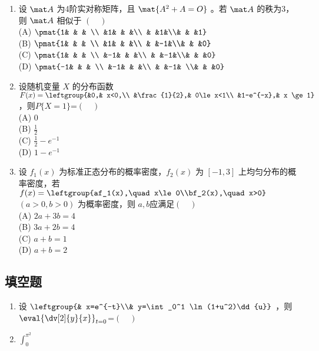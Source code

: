 \begin{enumerate}
\item 设 $\mat A$ 为4阶实对称矩阵，且 $\mat {A^2+A=O}$  。若 $\mat A$ 的秩为3，则 $\mat A$  相似于 $(\quad )$\\
(A) $\pmat{1& & &  \\ &1& & &\\ & &1&\\& & &1}$\\
(B) $\pmat{1& & &  \\ &1& & &\\ & &-1&\\& & &0}$\\
(C) $\pmat{1& & &  \\ &-1& & &\\ & &-1&\\& & &0}$\\
(D) $\pmat{-1& & & \\ &-1& & &\\ & &-1& \\& & &0}$
\item  设随机变量 $X$ 的分布函数 $F(x)=\leftgroup{&0,& x<0,\\ &\frac{1}{2},& 0\le x<1\\ &1-e^{-x},& x \ge 1}$   ，则$P\{X=1\}$=$(\quad )$\\
(A)  $0$\\
(B) $\frac{1}{2}$\\
(C)  $\frac{1}{2}-e^{-1}$\\
(D) $1-e^{-1}$
\item  设 $f_1(x)$ 为标准正态分布的概率密度，$f_2(x)$   为 $[-1,3]$ 上均匀分布的概率密度，若 $f(x)=\leftgroup{af_1(x),\quad x\le0\\bf_2(x),\quad x>0}\quad $ $(a>0,b>0)$ 为概率密度，则 $a,b$应满足$(\quad )$\\
(A) $2a+3b=4$\\
(B)   $3a+2b=4$\\
(C)  $a+b=1$\\
(D)   $a+b=2$
\end{enumerate}
\subsection{填空题}
\begin{enumerate}
\item 设 $\leftgroup{& x=e^{-t}\\& y=\int_0^1 \ln(1+u^2)\dd{u}}$   ，则 $\displaystyle \eval{\dv[2]{y}{x}}_{t=0}$=$(\quad )$
\item $\int_0^{\pi^2}$
\end{enumerate}